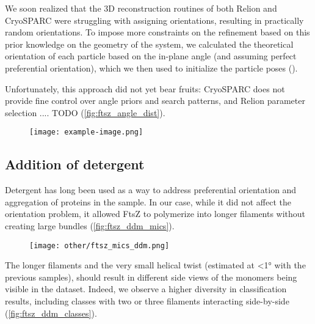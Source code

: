 We soon realized that the 3D reconstruction routines of both Relion and CryoSPARC were struggling with assigning orientations, resulting in practically random orientations.
To impose more constraints on the refinement based on this prior knowledge on the geometry of the system, we calculated the theoretical orientation of each particle based on the in-plane angle (and assuming perfect preferential orientation), which we then used to initialize the particle poses ().

Unfortunately, this approach did not yet bear fruits: CryoSPARC does not provide fine control over angle priors and search patterns, and Relion parameter selection .... TODO (\autoref{fig:ftsz_angle_dist}).

\begin{figure}[ht]
    \centering
    \texttt{[image: example-image.png]}
    \label{fig:ftsz_angle_dist}
\end{figure}

\subsection{Addition of detergent}

Detergent has long been used as a way to address preferential orientation and aggregation of proteins in the sample.
In our case, while it did not affect the orientation problem, it allowed FtsZ to polymerize into longer filaments without creating large bundles (\autoref{fig:ftsz_ddm_mics}).

\begin{figure}[ht]
    \centering
    \texttt{[image: other/ftsz\_mics\_ddm.png]}
    \label{fig:ftsz_ddm_mics}
\end{figure}

The longer filaments and the very small helical twist (estimated at <1° with the previous samples), should result in different side views of the monomers being visible in the dataset.
Indeed, we observe a higher diversity in classification results, including classes with two or three filaments interacting side-by-side (\autoref{fig:ftsz_ddm_classes}).

